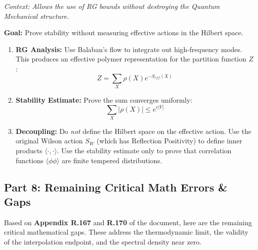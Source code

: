 \textit{Context: Allows the use of RG bounds without destroying the Quantum Mechanical structure.}

\textbf{Goal:} Prove stability without measuring effective actions in the Hilbert space.

\begin{enumerate}
    \item \textbf{RG Analysis:} Use Balaban's flow to integrate out high-frequency modes. This produces an effective polymer representation for the partition function $Z$:
    $$ Z = \sum_{X} \rho(X) e^{-S_{eff}(X)} $$
    \item \textbf{Stability Estimate:} Prove the sum converges uniformly:
    $$ \sum_X |\rho(X)| \le e^{c |V|} $$
    \item \textbf{Decoupling:} Do \textit{not} define the Hilbert space on the effective action. Use the original Wilson action $S_W$ (which has Reflection Positivity) to define inner products $\langle \cdot, \cdot \rangle$. Use the stability estimate only to prove that correlation functions $\langle \phi \phi \rangle$ are finite tempered distributions.
\end{enumerate}

\subsection{Part 8: Remaining Critical Math Errors \& Gaps}

Based on \textbf{Appendix R.167} and \textbf{R.170} of the document, here are the remaining critical mathematical gaps. These address the thermodynamic limit, the validity of the interpolation endpoint, and the spectral density near zero.


